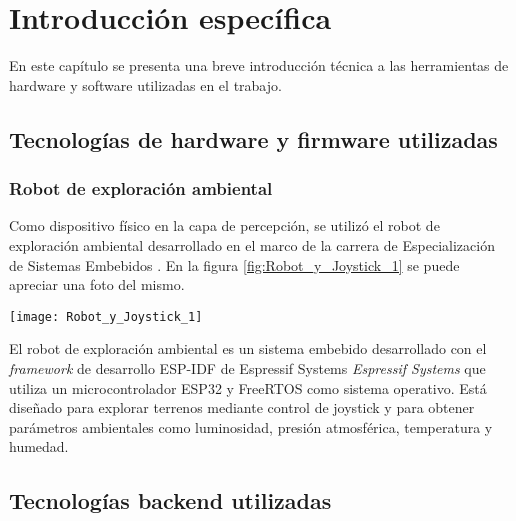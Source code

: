 \chapter{Introducción específica} %

\label{Chapter2}



En este capítulo se presenta una breve introducción técnica a las herramientas de hardware y software utilizadas en el trabajo.

\section{Tecnologías de hardware y firmware utilizadas}


\subsection{Robot de exploración ambiental}

Como dispositivo físico en la capa de percepción, se utilizó el robot de exploración ambiental desarrollado en el marco de la carrera de Especialización de Sistemas Embebidos \citep{cese_gonzalo_memoria}. En la figura \ref{fig:Robot_y_Joystick_1} se puede apreciar una foto del mismo.


\begin{center}
   \texttt{[image: Robot\_y\_Joystick\_1]}
   \label{fig:Robot_y_Joystick_1}
\end{center}

El robot de exploración ambiental es un sistema embebido desarrollado con el \textit{framework} de desarrollo ESP-IDF \cite{ESPIDF_home} de Espressif Systems \textit{Espressif Systems} que utiliza un microcontrolador ESP32 \cite{ESP32} y FreeRTOS \citep{FreeRTOS} como sistema operativo. Está diseñado para explorar terrenos mediante control de joystick y para obtener parámetros ambientales como luminosidad, presión atmosférica, temperatura y humedad.



\section{Tecnologías backend utilizadas}


